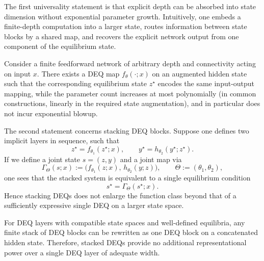 The first universality statement is that explicit depth can be absorbed into state dimension without exponential parameter growth. Intuitively, one embeds a finite-depth computation into a larger state, routes information between state blocks by a shared map, and recovers the explicit network output from one component of the equilibrium state.

\begin{cor}
\label{cor:deq_universality_v1}
Consider a finite feedforward network of arbitrary depth and connectivity acting on input $x$. There exists a DEQ map $f_\theta(\cdot; x)$ on an augmented hidden state such that the corresponding equilibrium state $z^\star$ encodes the same input-output mapping, while the parameter count increases at most polynomially (in common constructions, linearly in the required state augmentation), and in particular does not incur exponential blowup.
\end{cor}

The second statement concerns stacking DEQ blocks. Suppose one defines two implicit layers in sequence, such that
\begin{equation*}
    z^\star = f_{\theta_1}(z^\star; x),
    \qquad
    y^\star = h_{\theta_2}(y^\star; z^\star).
\end{equation*}
If we define a joint state $s = (z,y)$ and a joint map via
\begin{equation*}
    \Gamma_\Theta(s; x)
    := \big(f_{\theta_1}(z; x),\, h_{\theta_2}(y; z)\big),
    \qquad \Theta := (\theta_1,\theta_2),
\end{equation*}
one sees that the stacked system is equivalent to a single equilibrium condition
\begin{equation*}
    s^\star = \Gamma_\Theta(s^\star; x).
\end{equation*}
Hence stacking DEQs does not enlarge the function class beyond that of a sufficiently expressive single DEQ on a larger state space.

\begin{cor}
\label{thm:deq_no_stack_gain_v1}
For DEQ layers with compatible state spaces and well-defined equilibria, any finite stack of DEQ blocks can be rewritten as one DEQ block on a concatenated hidden state. Therefore, stacked DEQs provide no additional representational power over a single DEQ layer of adequate width.
\end{cor}

